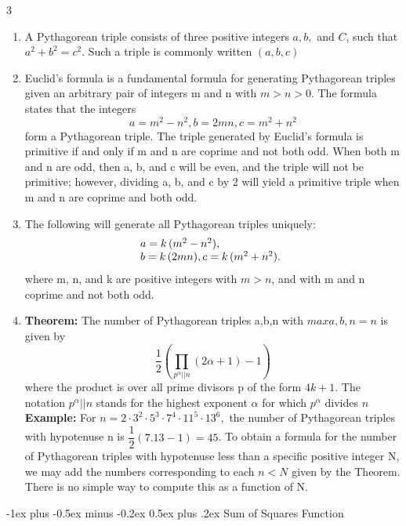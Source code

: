 \documentclass[8pt,a4paper,onesided]{article}
\makeatletter
\renewcommand{\subsection}{\@startsection{subsection}{2}{0mm}
    {-1ex plus -0.5ex minus -0.2ex} %
    {0.5ex plus .2ex}                %
    {\normalfont\large\bfseries}}    %
\makeatother
\begin{document}
\begin{multicols}{3}
\begin{enumerate}[resume]
    \item A Pythagorean triple consists of three positive integers $\displaystyle a, b,$ and $\displaystyle C$, such that $\displaystyle a^{2}+b^{2}=c^{2}$. Such a triple is commonly written $\displaystyle (a, b, c)$
    \item Euclid’s formula is a fundamental formula for generating Pythagorean triples given an arbitrary pair of integers m and n with $m >n >0$. The formula states that the integers
    \[\displaystyle a = m^{2}-n^{2}, b = 2mn,  c = m^{2}+n^{2}\]
    form a Pythagorean triple. The triple generated by Euclid’s formula is primitive if and only if m and n are coprime and not both odd. When both m and n are odd, then a, b, and c will be even, and the triple will not be primitive; however, dividing a, b, and c by 2 will yield a primitive triple when m and n are coprime and both odd.
    \item The following will generate all Pythagorean triples uniquely:
  \[
\begin{array}{@{}l}
a = k\,(m^{2} - n^{2}), \\
b = k\,(2mn),
c = k\,(m^{2} + n^{2}).
\end{array}
\]
    where m, n, and k are positive integers with $m > n$, and with m and n coprime and not both odd.
    \item \textbf{Theorem:}
    The number of Pythagorean triples
    {a,b,n} with $max{a,b,n} = n$ is given by
    \[\displaystyle \dfrac{1}{2}\left( \displaystyle\prod _{ p^{\alpha} || n}\left( 2\alpha +1\right) -1\right)\]
    where the product is over all prime divisors p of the form $4k+1$.
    The notation $\displaystyle p^{\alpha} || n$ stands for the highest exponent $\displaystyle \alpha$ for which $\displaystyle p^{\alpha}$ divides $n$
    \textbf{Example:}
    For $n = 2\cdot3^{2}\cdot5^{3}\cdot7^{4}\cdot11^{5}\cdot13^{6},$ the number of Pythagorean triples with hypotenuse n is $\displaystyle \dfrac{1}{2}\left( 7.13-1\right) =45$.
    To obtain a formula for the number of Pythagorean triples with hypotenuse less than a specific positive integer N, we may add the numbers corresponding to each $n < N$ given by the Theorem. There is no simple way to compute this as a function of N.
\end{enumerate}

\subsection{Sum of Squares Function}


\end{multicols}
\end{document}
